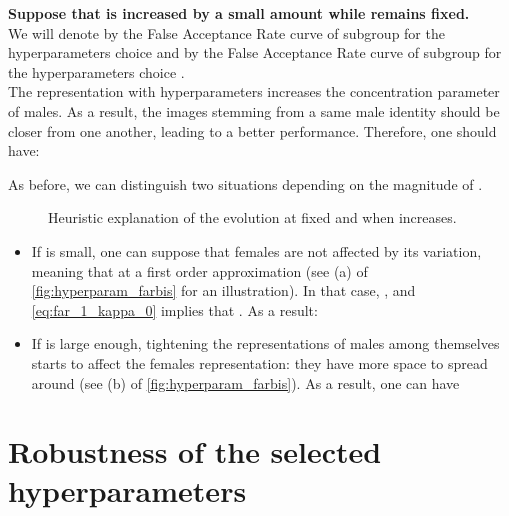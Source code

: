 \documentclass[nohyperref]{article}
\theoremstyle{plain}
\theoremstyle{definition}
\theoremstyle{remark}
\begin{document}
{\bf Suppose that  is increased by a small amount  while  remains fixed.}\\
We will denote by  the False Acceptance Rate curve of subgroup  for the hyperparameters choice  and by  the False Acceptance Rate curve of subgroup  for the hyperparameters choice .\\
The representation with hyperparameters  increases the concentration parameter of males. As a result, the images stemming from a same male identity should be closer from one another, leading to a better  performance. Therefore, one should have:

As before, we can distinguish two situations depending on the magnitude of .



\begin{figure}[h]
    \centering
    
     \hspace{0.2cm}


    
\caption{Heuristic explanation of the  evolution at fixed  and when  increases.}    \label{fig:hyperparam_farbis}
\end{figure}

\begin{itemize}
    \item If  is small, one can suppose that females are not affected by its variation, meaning that  at a first order approximation (see (a) of \autoref{fig:hyperparam_farbis} for an illustration). In that case, , and \autoref{eq:far_1_kappa_0} implies that . As a result:
     
    
    \item If  is large enough, tightening the representations of males among themselves starts to affect the females representation: they have more space to spread around (see (b) of \autoref{fig:hyperparam_farbis}). As a result, one can have 
     
\end{itemize}


\section{Robustness of the selected hyperparameters}\label{app:robustness_kappas}
\end{document}
